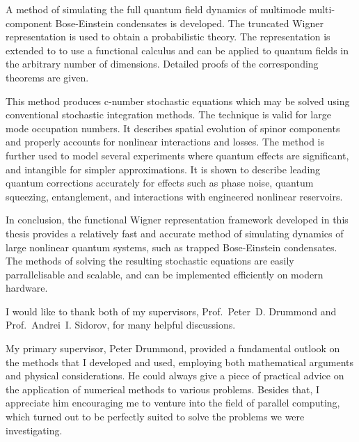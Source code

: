 

\cleardoublepage



A method of simulating the full quantum field dynamics of multimode multi-component Bose-Einstein condensates is developed.
The truncated Wigner representation is used to obtain a probabilistic theory.
The representation is extended to to use a functional calculus and can be applied to quantum fields in the arbitrary number of dimensions.
Detailed proofs of the corresponding theorems are given.

This method produces c-number stochastic equations which may be solved using conventional stochastic integration methods.
The technique is valid for large mode occupation numbers.
It describes spatial evolution of spinor components and properly accounts for nonlinear interactions and losses.
The method is further used to model several experiments where quantum effects are significant, and intangible for simpler approximations.
It is shown to describe leading quantum corrections accurately for effects such as phase noise, quantum squeezing, entanglement, and interactions with engineered nonlinear reservoirs.

In conclusion, the functional Wigner representation framework developed in this thesis provides a relatively fast and accurate method of simulating dynamics of large nonlinear quantum systems, such as trapped Bose-Einstein condensates.
The methods of solving the resulting stochastic equations are easily parrallelisable and scalable, and can be implemented efficiently on modern hardware.


\cleardoublepage


I would like to thank both of my supervisors, Prof.~Peter~D. Drummond and Prof.~Andrei~I. Sidorov, for many helpful discussions.

My primary supervisor, Peter Drummond, provided a fundamental outlook on the methods that I developed and used, employing both mathematical arguments and physical considerations.
He could always give a piece of practical advice on the application of numerical methods to various problems.
Besides that, I appreciate him encouraging me to venture into the field of parallel computing, which turned out to be perfectly suited to solve the problems we were investigating.

